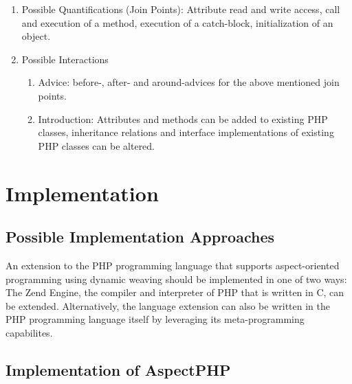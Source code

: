 \documentclass[portrait,a0]{a0poster}
\begin{document}
\begin{poster}
\begin{pcolumn}
\begin{pbox}
\begin{enumerate}
      \item

        Possible Quantifications (Join Points): Attribute read and write access,
        call and execution of a method, execution of a catch-block,
        initialization of an object.

      \item

         Possible Interactions

        \begin{enumerate}

          \item

            Advice: before-, after- and around-advices for the above mentioned
            join points.

          \item

            Introduction: Attributes and methods can be added to existing PHP
            classes, inheritance relations and interface implementations of
            existing PHP classes can be altered.

        \end{enumerate}

    \end{enumerate}

  \section{Implementation}

    \subsection{Possible Implementation Approaches}

      An extension to the PHP programming language that supports aspect-oriented
      programming using dynamic weaving should be implemented in one of two ways:
      The Zend Engine, the compiler and interpreter of PHP that is written in C,
      can be extended. Alternatively, the language extension can also be written
      in the PHP programming language itself by leveraging its meta-programming
      capabilites.

    \subsection{Implementation of AspectPHP}


\end{pbox}
\end{pcolumn}
\end{poster}
\end{document}
